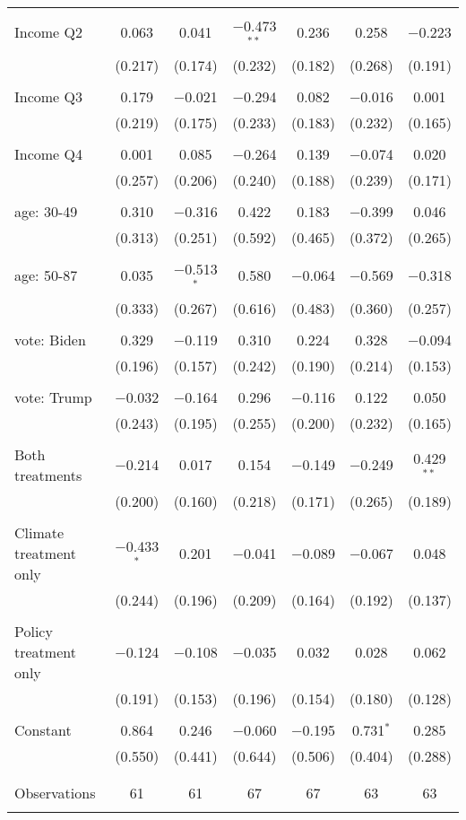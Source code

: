 \begin{tabular}{@{\extracolsep{5pt}}lcccccc}
  & & & & & & \\ 
 Income Q2 & 0.063 & 0.041 & $-$0.473$^{**}$ & 0.236 & 0.258 & $-$0.223 \\ 
  & (0.217) & (0.174) & (0.232) & (0.182) & (0.268) & (0.191) \\ 
  & & & & & & \\ 
 Income Q3 & 0.179 & $-$0.021 & $-$0.294 & 0.082 & $-$0.016 & 0.001 \\ 
  & (0.219) & (0.175) & (0.233) & (0.183) & (0.232) & (0.165) \\ 
  & & & & & & \\ 
 Income Q4 & 0.001 & 0.085 & $-$0.264 & 0.139 & $-$0.074 & 0.020 \\ 
  & (0.257) & (0.206) & (0.240) & (0.188) & (0.239) & (0.171) \\ 
  & & & & & & \\ 
 age: 30-49 & 0.310 & $-$0.316 & 0.422 & 0.183 & $-$0.399 & 0.046 \\ 
  & (0.313) & (0.251) & (0.592) & (0.465) & (0.372) & (0.265) \\ 
  & & & & & & \\ 
 age: 50-87 & 0.035 & $-$0.513$^{*}$ & 0.580 & $-$0.064 & $-$0.569 & $-$0.318 \\ 
  & (0.333) & (0.267) & (0.616) & (0.483) & (0.360) & (0.257) \\ 
  & & & & & & \\ 
 vote: Biden & 0.329 & $-$0.119 & 0.310 & 0.224 & 0.328 & $-$0.094 \\ 
  & (0.196) & (0.157) & (0.242) & (0.190) & (0.214) & (0.153) \\ 
  & & & & & & \\ 
 vote: Trump & $-$0.032 & $-$0.164 & 0.296 & $-$0.116 & 0.122 & 0.050 \\ 
  & (0.243) & (0.195) & (0.255) & (0.200) & (0.232) & (0.165) \\ 
  & & & & & & \\ 
 Both treatments & $-$0.214 & 0.017 & 0.154 & $-$0.149 & $-$0.249 & 0.429$^{**}$ \\ 
  & (0.200) & (0.160) & (0.218) & (0.171) & (0.265) & (0.189) \\ 
  & & & & & & \\ 
 Climate treatment only & $-$0.433$^{*}$ & 0.201 & $-$0.041 & $-$0.089 & $-$0.067 & 0.048 \\ 
  & (0.244) & (0.196) & (0.209) & (0.164) & (0.192) & (0.137) \\ 
  & & & & & & \\ 
 Policy treatment only & $-$0.124 & $-$0.108 & $-$0.035 & 0.032 & 0.028 & 0.062 \\ 
  & (0.191) & (0.153) & (0.196) & (0.154) & (0.180) & (0.128) \\ 
  & & & & & & \\ 
 Constant & 0.864 & 0.246 & $-$0.060 & $-$0.195 & 0.731$^{*}$ & 0.285 \\ 
  & (0.550) & (0.441) & (0.644) & (0.506) & (0.404) & (0.288) \\ 
  & & & & & & \\ 
\hline \\[-1.8ex] 

Observations & 61 & 61 & 67 & 67 & 63 & 63 \\ 
\hline 
\hline \\[-1.8ex] 
\end{tabular} 